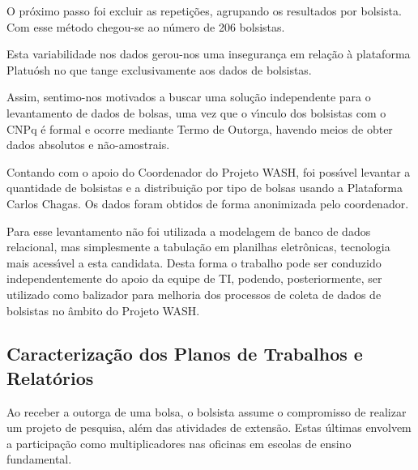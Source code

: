 \documentclass[
12pt,		%
openright,	%
twoside,  %
a4paper,			%
chapter=TITLE,		%
english,			%
french,				%
spanish,			%
brazil				%
]{USPSC-classe/USPSC_RedarTex}
\begin{document}
O pr\'oximo passo foi excluir as repeti\c{c}\~oes, agrupando os resultados por bolsista. Com esse m\'etodo chegou-se ao n\'umero de 206 bolsistas.








Esta variabilidade nos dados gerou-nos uma inseguran\c{c}a em rela\c{c}\~ao \`a plataforma Platu\'osh no que tange exclusivamente aos dados de bolsistas.








Assim, sentimo-nos motivados a buscar uma solu\c{c}\~ao independente para o levantamento de dados de bolsas, uma vez que o v\'{\i}nculo dos bolsistas com o CNPq \'e formal e ocorre mediante Termo de Outorga, havendo meios de obter dados absolutos e n\~ao-amostrais.








Contando com o apoio do Coordenador do Projeto WASH, foi poss\'{\i}vel levantar a quantidade de bolsistas e a distribui\c{c}\~ao por tipo de bolsas usando a Plataforma Carlos Chagas. Os dados foram obtidos de forma anonimizada pelo coordenador.








Para esse levantamento n\~ao foi utilizada a modelagem de banco de dados relacional, mas simplesmente a tabula\c{c}\~ao em planilhas eletr\^onicas, tecnologia mais acess\'{\i}vel a esta candidata. Desta forma o trabalho pode ser conduzido independentemente do apoio da equipe de TI, podendo, posteriormente, ser utilizado como balizador para melhoria dos processos de coleta de dados de bolsistas no \^ambito do Projeto WASH.








\subsection[Caracteriza\c{c}\~ao dos Planos de Trabalhos e Relat\'orios]{Caracteriza\c{c}\~ao dos Planos de Trabalhos e Relat\'orios}\label{Caracteriza\c{c}\~ao dos Planos de Trabalhos e Relat\'orios}
Ao receber a outorga de uma bolsa, o bolsista assume o compromisso de realizar um projeto de pesquisa, al\'em das atividades de extens\~ao. Estas \'ultimas envolvem a participa\c{c}\~ao como multiplicadores nas oficinas em escolas de ensino fundamental.
\end{document}
